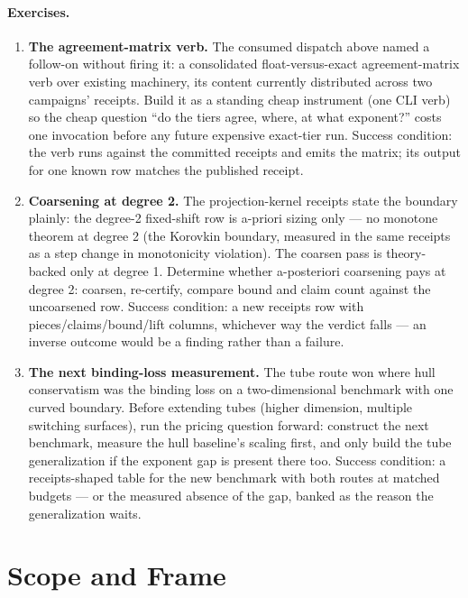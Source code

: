 \paragraph{Exercises.}
\begin{enumerate}
\item \textbf{The agreement-matrix verb.} The consumed dispatch above
  named a follow-on without firing it: a consolidated
  float-versus-exact agreement-matrix verb over existing machinery,
  its content currently distributed across two campaigns' receipts.
  Build it as a standing cheap instrument (one CLI verb) so the cheap
  question ``do the tiers agree, where, at what exponent?'' costs one
  invocation before any future expensive exact-tier run. Success
  condition: the verb runs against the committed receipts and emits the
  matrix; its output for one known row matches the published receipt.
\item \textbf{Coarsening at degree 2.} The projection-kernel receipts
  state the boundary plainly: the degree-2 fixed-shift row is a-priori
  sizing only --- no monotone theorem at degree 2 (the Korovkin
  boundary, measured in the same receipts as a step change in
  monotonicity violation). The coarsen pass is theory-backed only at
  degree 1. Determine whether a-posteriori coarsening pays at degree
  2: coarsen, re-certify, compare bound and claim count against the
  uncoarsened row. Success condition: a new receipts row with
  pieces/claims/bound/lift columns, whichever way the verdict falls ---
  an inverse outcome would be a finding rather than a failure.
\item \textbf{The next binding-loss measurement.} The tube route won
  where hull conservatism was the binding loss on a two-dimensional
  benchmark with one curved boundary. Before extending tubes (higher
  dimension, multiple switching surfaces), run the pricing question
  forward: construct the next benchmark, measure the hull baseline's
  scaling first, and only build the tube generalization if the
  exponent gap is present there too. Success condition: a
  receipts-shaped table for the new benchmark with both routes at
  matched budgets --- or the measured absence of the gap, banked as
  the reason the generalization waits.
\end{enumerate}

\section{Scope and Frame}
\label{sec:ckbk-scope-frame}


